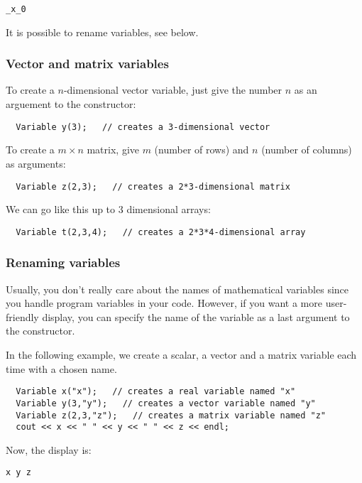 \begin{lstlisting}
_x_0
\end{lstlisting}

It is possible to rename variables, see below. %

\subsubsection{Vector and matrix variables}\label{sec:mod-var-vec}
To create a $n$-dimensional vector variable, just
give the number $n$ as an arguement to the constructor:

\begin{lstlisting}
  Variable y(3);   // creates a 3-dimensional vector
\end{lstlisting}

To create a $m\times n$ matrix, give $m$ (number of rows) and $n$ (number of columns) as arguments:

\begin{lstlisting}
  Variable z(2,3);   // creates a 2*3-dimensional matrix
\end{lstlisting}

We can go like this up to 3 dimensional arrays:

\begin{lstlisting}
  Variable t(2,3,4);   // creates a 2*3*4-dimensional array
\end{lstlisting}


\subsubsection{Renaming variables}\label{sec:mod-var-name}
Usually, you don't really care about the names of mathematical variables since you handle
program variables in your code.
However, if you want a more user-friendly display, you can specify
the name of the variable as a last argument to the constructor.

In the following example, we create a scalar, a vector and a matrix variable each
time with a chosen name.

\begin{lstlisting}
  Variable x("x");   // creates a real variable named "x"
  Variable y(3,"y");   // creates a vector variable named "y"
  Variable z(2,3,"z");   // creates a matrix variable named "z"
  cout << x << " " << y << " " << z << endl;
\end{lstlisting}

Now, the display is:
\begin{lstlisting}
x y z
\end{lstlisting}


